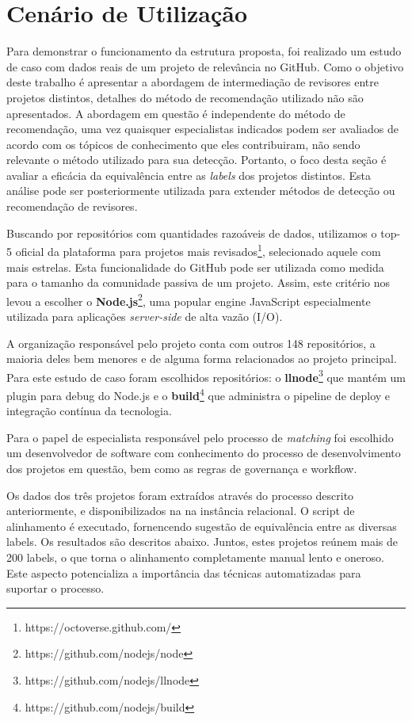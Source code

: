\documentclass[sigconf]{acmart}
\begin{document}
\section{Cenário de Utilização}

Para demonstrar o funcionamento da estrutura proposta, foi realizado um estudo de caso com dados reais de um projeto de relevância no GitHub. Como o objetivo deste trabalho é apresentar a abordagem de intermediação de revisores entre projetos distintos, detalhes do método de recomendação utilizado não são apresentados. A abordagem em questão é independente do método de recomendação, uma vez quaisquer especialistas indicados podem ser avaliados de acordo com os tópicos de conhecimento que eles contribuiram, não sendo relevante o método utilizado para sua detecção. Portanto, o foco desta seção é avaliar a eficácia da equivalência entre as \textit{labels} dos projetos distintos. Esta análise pode ser posteriormente utilizada para extender métodos de detecção ou recomendação de revisores.

Buscando por repositórios com quantidades razoáveis de dados, utilizamos o top-5 oficial da plataforma para projetos mais revisados\footnote{https://octoverse.github.com/}, selecionado aquele com mais estrelas. Esta funcionalidade do GitHub pode ser utilizada como medida para o tamanho da comunidade passiva de um projeto\cite{sheoran2014}. Assim, este critério nos levou a escolher o \textbf{Node.js}\footnote{https://github.com/nodejs/node}, uma popular engine JavaScript especialmente utilizada para aplicações \textit{server-side} de alta vazão (I/O).

A organização responsável pelo projeto conta com outros 148 repositórios, a maioria deles bem menores e de alguma forma relacionados ao projeto principal. Para este estudo de caso foram escolhidos repositórios: o \textbf{llnode}\footnote{https://github.com/nodejs/llnode} que mantém um plugin para debug do Node.js e o \textbf{build}\footnote{https://github.com/nodejs/build} que administra o pipeline de deploy e integração contínua da tecnologia.

Para o papel de especialista responsável pelo processo de \textit{matching} foi escolhido um desenvolvedor de software com conhecimento do processo de desenvolvimento dos projetos em questão, bem como as regras de governança e workflow.

Os dados dos três projetos foram extraídos através do processo descrito anteriormente, e disponibilizados na na instância relacional. O script de alinhamento é executado, fornencendo sugestão de equivalência entre as diversas labels. Os resultados são descritos abaixo. Juntos, estes projetos reúnem mais de 200 labels, o que torna o alinhamento completamente manual lento e oneroso. Este aspecto potencializa a importância das técnicas automatizadas para suportar o processo.
\end{document}
